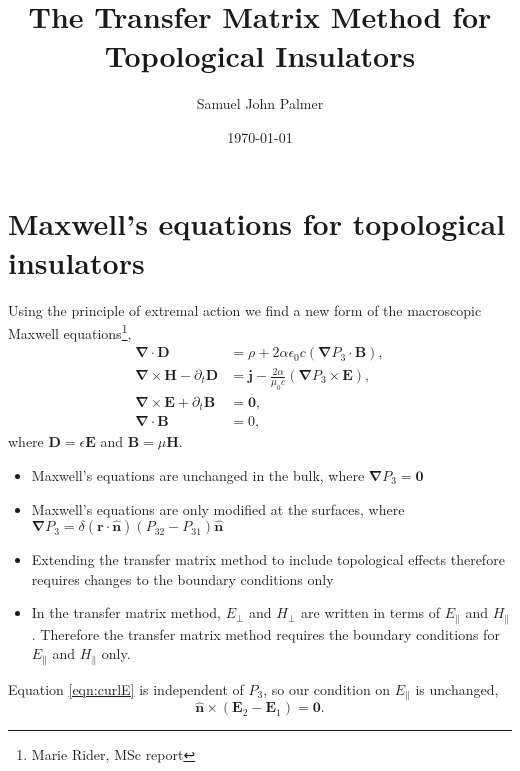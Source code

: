 \documentclass[notitlepage,nofootinbib]{revtex4-1}
\renewcommand{\vec}[1]{\mathbf{#1}}
\newcommand{\grad}{\boldsymbol{\nabla}}
\newcommand{\divg}{\boldsymbol{\nabla}\cdot}
\newcommand{\curl}{\boldsymbol{\nabla}\times}
\begin{document}
\title{The Transfer Matrix Method for Topological Insulators}
\author{Samuel John Palmer}
\date{\today}
\maketitle

\section{Maxwell's equations for topological insulators}
Using the principle of extremal action we find a new form of the macroscopic Maxwell equations\footnote{Marie Rider, MSc report},
\begin{subequations}\begin{alignat}{2}
	\label{eqn:divgD}
	\divg \vec{D}
	&=
	\rho + 2 \alpha \epsilon_0 c \left(\grad P_3 \cdot \vec{B}\right),
	\\
	\label{eqn:curlH}
	\curl \vec{H} - \partial_t \vec{D}
	&=
	\vec{j} - \frac{2\alpha}{\mu_0c}\left(\grad P_3 \times \vec{E} \right),
	\\
	\label{eqn:curlE}
	\curl \vec{E} + \partial_t \vec{B}
	&=
	\vec{0},
	\\
	\label{eqn:divgB}
	\divg \vec{B}
	&=
	0,
\end{alignat}\end{subequations}
where $ \vec{D} = \epsilon \vec{E} $ and $ \vec{B} = \mu \vec{H} $.

\begin{itemize}
	\item Maxwell's equations are unchanged in the bulk, where $ \grad P_3 = \vec{0} $
	\item Maxwell's equations are only modified at the surfaces, where $ \grad P_3 = \delta(\vec{r}\cdot\vec{\hat{n}}) (P_{32} - P_{31}) \vec{\hat{n}} $
	\item Extending the transfer matrix method to include topological effects therefore requires changes to the boundary conditions only
	\item In the transfer matrix method, $ E_\perp $ and $ H_\perp $ are written in terms of $ E_\parallel $ and $ H_\parallel $. Therefore the transfer matrix method requires the boundary conditions for $ E_\parallel $ and $ H_\parallel $ only.
\end{itemize}

Equation \eqref{eqn:curlE} is independent of $ P_3 $, so our condition on $ E_\parallel $ is unchanged,
\begin{equation}
	\label{eqn:EBC}
	\vec{\hat{n}} \times (\vec{E}_2 - \vec{E}_1) = \vec{0}.
\end{equation}
\end{document}

